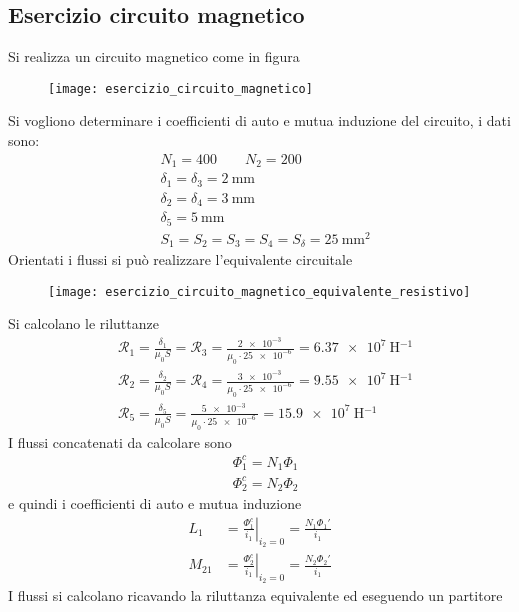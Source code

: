 
\subsection{Esercizio circuito magnetico}
Si realizza un circuito magnetico come in figura
\begin{figure}[H]
\centering
\texttt{[image: esercizio\_circuito\_magnetico]}
\end{figure}

Si vogliono determinare i coefficienti di auto e mutua induzione del circuito, i dati
sono:
$$
\begin{aligned}
&N_1 = 400 \qquad N_2 = 200\\
&\delta_1 = \delta_3 = \SI{2}{\milli\meter}\\
&\delta_2=\delta_4 = \SI{3}{\milli\meter} \\
&\delta_5 = \SI{5}{\milli\meter}\\
&S_1 = S_2 = S_3 = S_4 = S_\delta = \SI{25}{\milli\meter^2}
\end{aligned}
$$
Orientati i flussi si può realizzare l'equivalente circuitale
\begin{figure}[H]
\centering
\texttt{[image: esercizio\_circuito\_magnetico\_equivalente\_resistivo]}
\end{figure}
Si calcolano le riluttanze
$$\begin{aligned}
&\mathcal{R}_1 = \frac{\delta_1}{\mu_0 S} = \mathcal{R}_3 = \frac{\SI{2e-3}{}}{\mu_0\cdot\SI{25e-6}{}} = \SI{6.37e7}{\henry^{-1}}\\
&\mathcal{R}_2 = \frac{\delta_2}{\mu_0S} = \mathcal{R}_4 = \frac{\SI{3e-3}{}}{\mu_0\cdot\SI{25e-6}{}} = \SI{9.55e7}{\henry^{-1}}\\
&\mathcal{R}_5 = \frac{\delta_5}{\mu_0S} = \frac{\SI{5e-3}{}}{\mu_0\cdot\SI{25e-6}{}} = \SI{15.9e7}{\henry^{-1}}\end{aligned}
$$
\newpage
I flussi concatenati da calcolare sono 
$$
\begin{aligned}
&\Phi_1^c = N_1\Phi_1\\
&\Phi_2^c = N_2\Phi_2
\end{aligned}
$$
e quindi i coefficienti di auto e mutua induzione
$$
\begin{aligned}
L_1 &= \left.\frac{\Phi_1^c}{i_1}\right|_{i_2=0} = \frac{N_1\Phi_1'}{i_1}\\
M_{21} &= \left.\frac{\Phi_2^c}{i_1}\right|_{i_2=0} = \frac{N_2\Phi_2'}{i_1}
\end{aligned}
$$
I flussi si calcolano ricavando la riluttanza equivalente ed eseguendo un partitore
